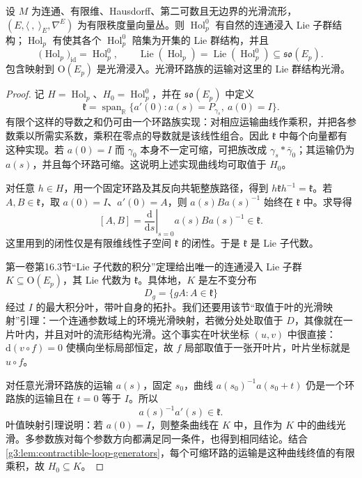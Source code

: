 \begin{theorem}\label{g3:thm:holonomy-lie-group}
	设 \(M\) 为连通、有限维、Hausdorff、第二可数且无边界的光滑流形，\((E,\langle\ ,\ \rangle_E,\nabla^E)\) 为有限秩度量向量丛。则 \(\operatorname{Hol}_p^0\) 有自然的连通浸入 Lie 子群结构；\(\operatorname{Hol}_p\) 有使其各个 \(\operatorname{Hol}_p^0\) 陪集为开集的 Lie 群结构，并且
	\[
		\bigl(\operatorname{Hol}_p\bigr)_{\mathrm{id}}=\operatorname{Hol}_p^0,
		\qquad
		\operatorname{Lie}(\operatorname{Hol}_p)=\operatorname{Lie}(\operatorname{Hol}_p^0)
		\subseteq\mathfrak{so}(E_p).
	\]
	包含映射到 \(\mathrm O(E_p)\) 是光滑浸入。光滑环路族的运输对这里的 Lie 群结构光滑。
\end{theorem}
\begin{proof}
	记 \(H=\operatorname{Hol}_p\)、\(H_0=\operatorname{Hol}_p^0\)，并在 \(\mathfrak{so}(E_p)\) 中定义
	\[
		\mathfrak k=\operatorname{span}_{\mathbb R}
		\{a'(0):a(s)=P_{\gamma_s},\ a(0)=I\}.
	\]
	有限个这样的导数之和仍可由一个环路族实现：对相应运输曲线作乘积，并把各参数乘以所需实系数，乘积在零点的导数就是该线性组合。因此 \(\mathfrak k\) 中每个向量都有这种实现。若 \(a(0)=I\) 而 \(\gamma_0\) 本身不一定可缩，可把族改成 \(\gamma_s*\bar\gamma_0\)；其运输仍为 \(a(s)\)，并且每个环路可缩。这说明上述实现曲线均可取值于 \(H_0\)。

	对任意 \(h\in H\)，用一个固定环路及其反向共轭整族路径，得到 \(h\mathfrak k h^{-1}=\mathfrak k\)。若 \(A,B\in\mathfrak k\)，取 \(a(0)=I\)、\(a'(0)=A\)，则 \(a(s)Ba(s)^{-1}\) 始终在 \(\mathfrak k\) 中。求导得
	\[
		[A,B]=\left.\frac{\mathrm d}{\mathrm ds}\right|_{s=0}a(s)Ba(s)^{-1}\in\mathfrak k.
	\]
	这里用到的闭性仅是有限维线性子空间 \(\mathfrak k\) 的闭性。于是 \(\mathfrak k\) 是 Lie 子代数。

	第一卷第16.3节“Lie 子代数的积分”定理给出唯一的连通浸入 Lie 子群 \(K\subseteq\mathrm O(E_p)\)，其 Lie 代数为 \(\mathfrak k\)。具体地，\(K\) 是左不变分布
	\[
		D_g=\{gA:A\in\mathfrak k\}
	\]
	经过 \(I\) 的最大积分叶，带叶自身的拓扑。我们还要用该节“取值于叶的光滑映射”引理：一个连通参数域上的环境光滑映射，若微分处处取值于 \(D\)，其像就在一片叶内，并且对叶的流形结构光滑。这个事实在叶状坐标 \((u,v)\) 中很直接：\(\mathrm d(v\circ f)=0\) 使横向坐标局部恒定，故 \(f\) 局部取值于一张开叶片，叶片坐标就是 \(u\circ f\)。

	对任意光滑环路族的运输 \(a(s)\)，固定 \(s_0\)，曲线 \(a(s_0)^{-1}a(s_0+t)\) 仍是一个环路族的运输且在 \(t=0\) 等于 \(I\)。所以
	\begin{equation}\label{g3:eq:holonomy-family-logarithmic-derivative}
		a(s)^{-1}a'(s)\in\mathfrak k.
	\end{equation}
	叶值映射引理说明：若 \(a(0)=I\)，则整条曲线在 \(K\) 中，且作为 \(K\) 中的曲线光滑。多参数族对每个参数方向都满足同一条件，也得到相同结论。结合\cref{g3:lem:contractible-loop-generators}，每个可缩环路的运输是这种曲线终值的有限乘积，故 \(H_0\subseteq K\)。


\end{proof}
